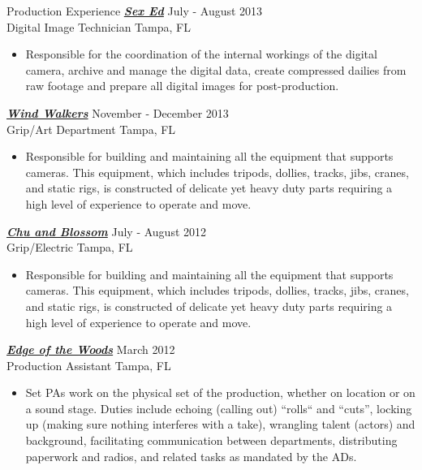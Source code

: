 \begin{section}{Production Experience}
  {\sl \textbf{\href{http://http://www.imdb.com/title/tt2751310}{Sex Ed}}} \hfill July - August 2013 \\
  Digital Image Technician \hfill Tampa, FL
  \begin{itemize}
  \item
    Responsible for the coordination of the internal workings of the digital camera, archive and manage the digital data, create compressed dailies from raw footage and prepare all digital images for post-production.
  \end{itemize}

  {\sl \textbf{\href{http://www.imdb.com/title/tt1236254}{Wind Walkers}}} \hfill November - December 2013 \\
  Grip/Art Department \hfill Tampa, FL
  \begin{itemize}
  \item
    Responsible for building and maintaining all the equipment that supports cameras. This equipment, which includes tripods, dollies, tracks, jibs, cranes, and static rigs, is constructed of delicate yet heavy duty parts requiring a high level of experience to operate and move.
  \end{itemize}

  {\sl \textbf{\href{http://www.imdb.com/title/tt2339064}{Chu and Blossom}}} \hfill July - August 2012 \\
  Grip/Electric \hfill Tampa, FL
  \begin{itemize}
  \item
    Responsible for building and maintaining all the equipment that supports cameras. This equipment, which includes tripods, dollies, tracks, jibs, cranes, and static rigs, is constructed of delicate yet heavy duty parts requiring a high level of experience to operate and move.
  \end{itemize}

  {\sl \textbf{\href{http://www.imdb.com/title/tt3268422}{Edge of the Woods}}} \hfill March 2012 \\
  Production Assistant \hfill Tampa, FL
  \begin{itemize}
  \item
    Set PAs work on the physical set of the production, whether on location or on a sound stage. Duties include echoing (calling out) ``rolls`` and ``cuts'', locking up (making sure nothing interferes with a take), wrangling talent (actors) and background, facilitating communication between departments, distributing paperwork and radios, and related tasks as mandated by the ADs.
  \end{itemize}
\end{section}
